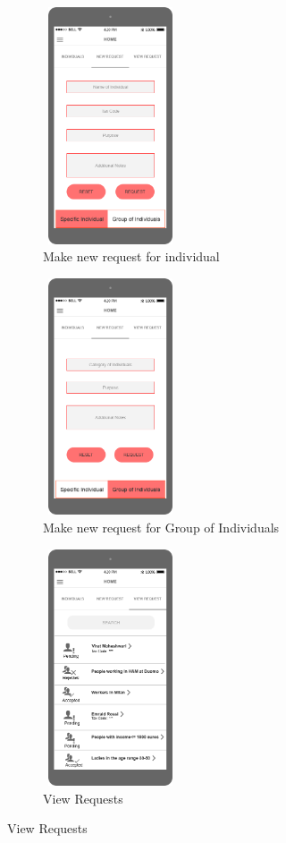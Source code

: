 \begin{figure}[H]
	\centering
     \begin{subfigure}[b]{0.4\textwidth}	
		\includegraphics[width=4cm,height=7cm]		{./RASD_Mockups/4_T_1-NewRequest.png}
      	\caption{Make new request for individual}
        \label{TrackMe_reqind}
	 \end{subfigure}
     \begin{subfigure}[b]{0.4\textwidth}	
		\includegraphics[width=4cm,height=7cm]		{./RASD_Mockups/4_T_2-NewRequest.png}
      	\caption{Make new request for Group of Individuals}
        \label{TrackMe_reqgroup}
	 \end{subfigure}
     \begin{subfigure}[b]{0.4\textwidth}	
		\includegraphics[width=4cm,height=7cm]		{./RASD_Mockups/5_T-ViewRequest.png}
      	\caption{View Requests}
        \label{TrackMe_viewreq}
	 \end{subfigure}
\end{figure}
